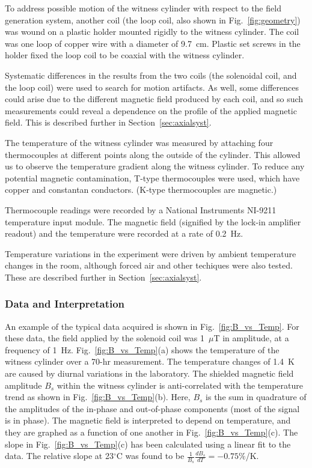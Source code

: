 To address possible motion of the witness cylinder with respect to the
field generation system, another coil (the loop coil, also shown in
Fig.~\ref{fig:geometry}) was wound on a plastic holder mounted rigidly
to the witness cylinder.  The coil was one loop of copper wire with a
diameter of 9.7~cm.  Plastic set screws in the holder fixed the loop
coil to be coaxial with the witness cylinder.

Systematic differences in the results from the two coils (the
solenoidal coil, and the loop coil) were used to search for motion
artifacts.  As well, some differences could arise due to the different
magnetic field produced by each coil, and so such measurements could
reveal a dependence on the profile of the applied magnetic field.
This is described further in Section~\ref{sec:axialsyst}.

The temperature of the witness cylinder was measured by attaching four
thermocouples at different points along the outside of the cylinder.
This allowed us to observe the temperature gradient along the witness
cylinder.  To reduce any potential magnetic contamination, T-type
thermocouples were used, which have copper and constantan conductors.
(K-type thermocouples are magnetic.)

Thermocouple readings were recorded by a National Instruments NI-9211
temperature input module.  The magnetic field (signified by the
lock-in amplifier readout) and the temperature were recorded at a rate
of 0.2~Hz.

Temperature variations in the experiment were driven by ambient
temperature changes in the room, although forced air and other
techiques were also tested.  These are described further in
Section~\ref{sec:axialsyst}.


\subsubsection{Data and Interpretation\label{sec:axialsyst}}

An example of the typical data acquired is shown in
Fig.~\ref{fig:B_vs_Temp}.  For these data, the field applied by the
solenoid coil was 1~$\mu$T in amplitude, at a frequency of 1~Hz.
Fig.~\ref{fig:B_vs_Temp}(a) shows the temperature of the witness
cylinder over a 70-hr measurement.  The temperature changes of 1.4~K
are caused by diurnal variations in the laboratory.  The shielded
magnetic field amplitude $B_s$ within the witness cylinder is
anti-correlated with the temperature trend as shown in
Fig.~\ref{fig:B_vs_Temp}(b).  Here, $B_s$ is the sum in quadrature of
the amplitudes of the in-phase and out-of-phase components (most of
the signal is in phase).  The magnetic field is interpreted to depend
on temperature, and they are graphed as a function of one another in
Fig.~\ref{fig:B_vs_Temp}(c).  The slope in Fig.~\ref{fig:B_vs_Temp}(c)
has been calculated using a linear fit to the data.  The relative
slope at 23$^\circ$C was found to be
$\frac{1}{B_s}\frac{dB_s}{dT}=-0.75\%$/K.

